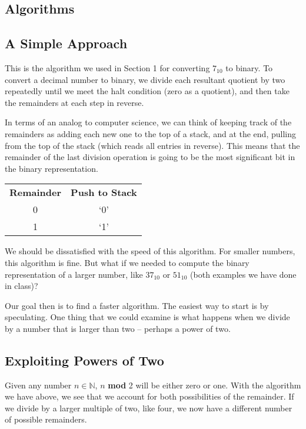 \documentclass[12pt]{article}
\begin{document}
\begin{center}
  \section{Algorithms}
\end{center}
\subsection{A Simple Approach}
This is the algorithm we used in Section 1 for converting $7_{10}$ to binary.  To convert a decimal number to binary, we divide each resultant quotient by two repeatedly until we meet the halt condition (zero as a quotient), and then take the remainders at each step in reverse.

\par In terms of an analog to computer science, we can think of keeping track of the remainders as adding each new one to the top of a stack, and at the end, pulling from the top of the stack (which reads all entries in reverse). This means that the remainder of the last division operation is going to be the most significant bit in the binary representation.

\begin{center}
  \begin{tabular}{c|c}
    \textbf{Remainder} & \textbf{Push to Stack} \\
    0 & `0' \\
    1 & `1'
  \end{tabular}
\end{center}

\par We should be dissatisfied with the speed of this algorithm. For smaller numbers, this algorithm is fine. But what if we needed to compute the binary representation of a larger number, like $37_{10}$ or $51_{10}$ (both examples we have done in class)?

\par Our goal then is to find a faster algorithm. The easiest way to start is by speculating. One thing that we could examine is what happens when we divide by a number that is larger than two -- perhaps a power of two.

\subsection{Exploiting Powers of Two}
Given any number $n\in\mathbb{N}$, $n$ \textbf{mod} 2 will be either zero or one. With the algorithm we have above, we see that we account for both possibilities of the remainder. If we divide by a larger multiple of two, like four, we now have a different number of possible remainders.
\end{document}
